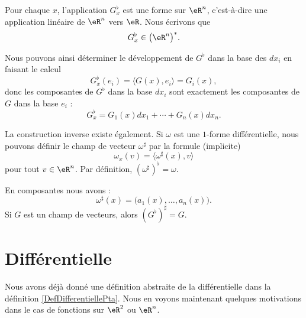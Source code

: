 Pour chaque $x$, l'application $G_x^{\flat}$ est une forme sur $\eR^n$, c'est-à-dire une application linéaire de $\eR^n$ vers $\eR$. Nous écrivons que
\begin{equation}
	G_x^{\flat}\in\big( \eR^n \big)^*.
\end{equation}

Nous pouvons ainsi déterminer le développement de $G^{\flat}$ dans la base des $dx_i$ en faisant le calcul
\begin{equation}
	G_x^{\flat}(e_i)=\langle G(x), e_i\rangle =G_i(x),
\end{equation}
donc les composantes de $G^{\flat}$ dans la base $dx_i$ sont exactement les composantes de $G$ dans la base $e_i$ :
\begin{equation}
	G^{\flat}_x=G_1(x)dx_1+\cdots+G_n(x)dx_n.
\end{equation}

La construction inverse existe également. Si $\omega$ est une $1$-forme différentielle, nous pouvons définir le champ de vecteur $\omega^{\sharp}$ par la formule (implicite)
\begin{equation}
	\omega_x(v)=\langle \omega^{\sharp}(x), v\rangle
\end{equation}
pour tout $v\in\eR^n$. Par définition, $(\omega^{\sharp})^{\flat}=\omega$.

\begin{lemma}
    En composantes nous avons :
	\begin{equation}
		\omega^{\sharp}(x)=\big( a_1(x),\ldots,a_n(x) \big).
	\end{equation}
	Si $G$ est un champ de vecteurs, alors $(G^{\flat})^{\sharp}=G$.
\end{lemma}

\section{Différentielle}

Nous avons déjà donné une définition abstraite de la différentielle dans la définition \ref{DefDifferentiellePta}. Nous en voyons maintenant quelques motivations dans le cas de fonctions sur \( \eR^2\) ou \( \eR^n\).

